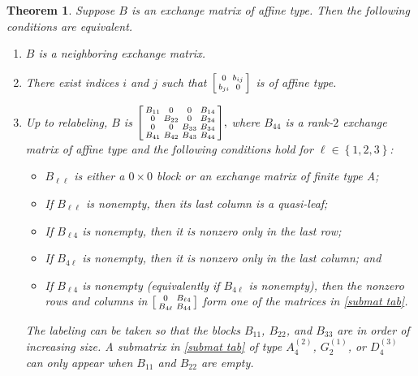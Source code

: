 \documentclass{amsart}
\newtheorem{theorem}[proposition]{Theorem}
\theoremstyle{definition}
\theoremstyle{remark}
\numberwithin{equation}{section}
\newcommand{\set}[1]{{\left\lbrace #1 \right\rbrace}}
\newcommand{\0}{{\mathbf{0}}}
\renewcommand{\b}{\mathbf{b}}
\begin{document}
\begin{theorem}\label{neigh B}
Suppose $B$ is an exchange matrix of affine type.
Then the following conditions are equivalent.
\begin{enumerate}[\quad\rm(i)]
\item \label{neigh}
$B$ is a neighboring exchange matrix.
\item \label{aff 2}
There exist indices $i$ and $j$ such that $\begin{bsmallmatrix}0&b_{ij}\\b_{ji}&0\end{bsmallmatrix}$ is of affine type.
\item \label{neigh detailed}
Up to relabeling, $B$ is
    $
      \begin{bsmallmatrix}
        B_{11} 	& 0 		& 0 		& B_{14} \\ 
        0 		& B_{22} 	& 0 		& B_{24} \\
        0 		& 0 		& B_{33} 	& B_{34} \\
        B_{41} 	& B_{42} 	& B_{43} 	& B_{44}
      \end{bsmallmatrix},
    $ 
where $B_{44}$ is a rank-$2$ exchange matrix of affine type and the following conditions hold for ${\ell\in\set{1,2,3}}$:
\begin{itemize}
\item
$B_{\ell\ell}$ is either a $0\times0$ block or an exchange matrix of finite type A; %
\item
If $B_{\ell\ell}$ is nonempty, then its last column is a quasi-leaf;
\item
If $B_{\ell4}$ is nonempty, then it is nonzero only in the last row;
\item
If $B_{4\ell}$ is nonempty, then it is nonzero only in the last column; and
\item
If $B_{\ell4}$ is nonempty (equivalently if $B_{4\ell}$ is nonempty), then the nonzero rows and columns in $\begin{bsmallmatrix} 0 & B_{\ell4} \\ B_{4\ell} & B_{44} \end{bsmallmatrix}$ form one of the matrices in \cref{submat tab}.
\end{itemize}
The labeling can be taken so that the blocks $B_{11}$, $B_{22}$, and $B_{33}$ are in order of increasing size. 
A submatrix in \cref{submat tab} of type $A_{4}^{(2)}$, $G_{2}^{(1)}$, or $D_{4}^{(3)}$ can only appear when $B_{11}$ and $B_{22}$ are empty.
\end{enumerate}
\end{theorem}
\end{document}
